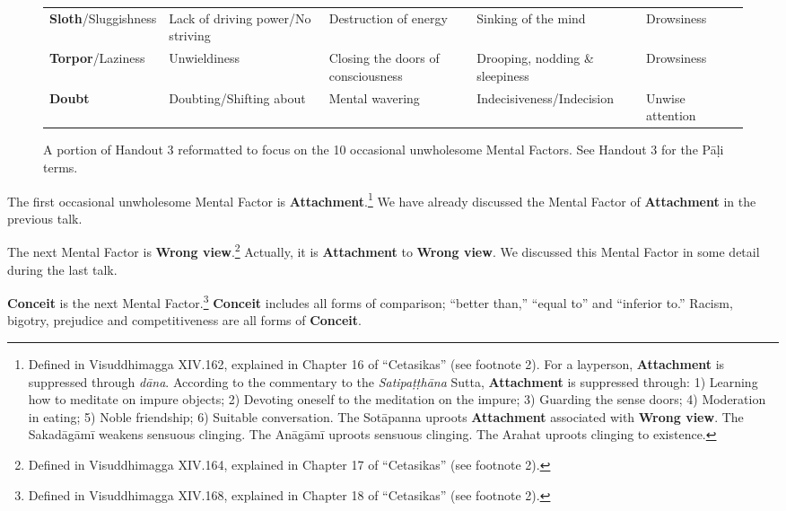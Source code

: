 \begin{figure} [H]
\begin{tabular}{P{0.25\textwidth} | C{.185\textwidth} C{0.185\textwidth} C{0.185\textwidth} C{0.195\textwidth} m{0mm}}
\textbf{Sloth}/\newline Sluggishness & Lack of driving power/No striving & Destruction of energy & Sinking of the mind & Drowsiness &\\[9mm]
\textbf{Torpor}/\newline Laziness & Unwieldiness & Closing the doors of consciousness & Drooping, nodding \& sleepiness & Drowsiness &\\[9mm]
\textbf{Doubt} & Doubting/\newline Shifting about & Mental wavering & Indecisiveness/\newline Indecision & Unwise attention &\\[9mm]
\bottomrule
\end{tabular}

\caption{A portion of Handout 3 reformatted to focus on the 10 occasional unwholesome Mental Factors. See Handout 3 for the Pāḷi terms.}

\end{figure}

The first occasional unwholesome Mental Factor is \textbf{Attachment}.\footnote{Defined in Visuddhimagga XIV.162, explained in Chapter 16 of “Cetasikas” (see footnote 2). For a layperson, \textbf{Attachment} is suppressed through \textit{dāna}. According to the commentary to the \textit{Satipaṭṭhāna} Sutta, \textbf{Attachment} is suppressed through: 1) Learning how to meditate on impure objects; 2) Devoting oneself to the meditation on the impure; 3) Guarding the sense doors; 4) Moderation in eating; 5) Noble friendship; 6) Suitable conversation. The Sotāpanna uproots \textbf{Attachment} associated with \textbf{Wrong view}. The Sakadāgāmī weakens sensuous clinging. The Anāgāmī uproots sensuous clinging. The Arahat uproots clinging to existence.
} We have already discussed the Mental Factor of \textbf{Attachment} in the previous talk.

The next Mental Factor is \textbf{Wrong view}.\footnote{Defined in Visuddhimagga XIV.164, explained in Chapter 17 of “Cetasikas” (see footnote 2).} Actually, it is \textbf{Attachment} to \textbf{Wrong view}. We discussed this Mental Factor in some detail during the last talk.

\textbf{Conceit} is the next Mental Factor.\footnote{Defined in Visuddhimagga XIV.168, explained in Chapter 18 of “Cetasikas” (see footnote 2).}  \textbf{Conceit} includes all forms of comparison; “better than,” “equal to” and “inferior to.” Racism, bigotry, prejudice and competitiveness are all forms of \textbf{Conceit}.

